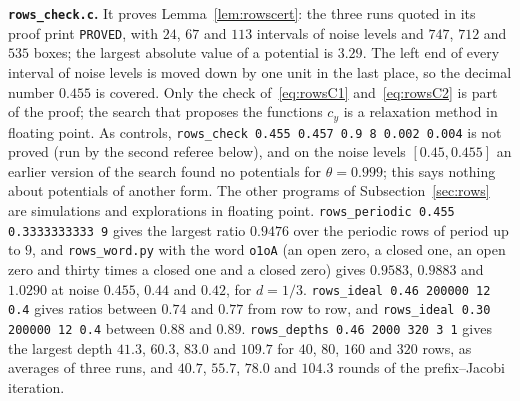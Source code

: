 \documentclass[11pt]{amsart}
\theoremstyle{definition}
\theoremstyle{remark}
\begin{document}
\medskip\noindent\textbf{\texttt{rows\_check.c}.} It proves Lemma~\ref{lem:rowscert}: the three
runs quoted in its proof print \texttt{PROVED}, with $24$, $67$ and $113$ intervals of noise
levels and $747$, $712$ and $535$ boxes; the largest absolute value of a potential is $3.29$. The
left end of every interval of noise levels is moved down by one unit in the last place, so the
decimal number $0.455$ is covered. Only the check of~\eqref{eq:rowsC1} and~\eqref{eq:rowsC2} is
part of the proof; the search that proposes the functions $c_y$ is a relaxation method in floating
point. As controls, \texttt{rows\_check 0.455 0.457 0.9 8 0.002 0.004} is not proved (run by the
second referee below), and on the noise levels $[0.45,0.455]$ an earlier version of the search
found no potentials for $\theta=0.999$; this says nothing about potentials of another form. The other programs of Subsection~\ref{sec:rows} are
simulations and explorations in floating point. \texttt{rows\_periodic 0.455 0.3333333333 9}
gives the largest ratio $0.9476$ over the periodic rows of period up to $9$, and
\texttt{rows\_word.py} with the word \texttt{o1oA} (an open zero, a closed one, an open zero and
thirty times a closed one and a closed zero) gives $0.9583$, $0.9883$ and $1.0290$ at noise
$0.455$, $0.44$ and $0.42$, for $d=1/3$. \texttt{rows\_ideal 0.46 200000 12 0.4} gives ratios
between $0.74$ and $0.77$ from row to row, and \texttt{rows\_ideal 0.30 200000 12 0.4} between
$0.88$ and $0.89$. \texttt{rows\_depths 0.46 2000 320 3 1} gives the largest depth $41.3$,
$60.3$, $83.0$ and $109.7$ for $40$, $80$, $160$ and $320$ rows, as averages of three runs, and
$40.7$, $55.7$, $78.0$ and $104.3$ rounds of the prefix--Jacobi iteration.
\end{document}
